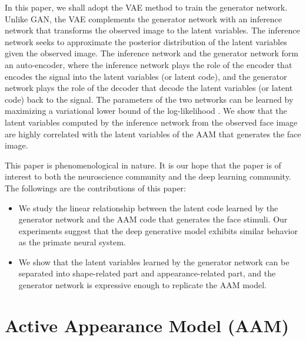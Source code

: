 \documentclass{article}
\begin{document}
In this paper, we shall adopt the VAE method to train the generator network. Unlike GAN, the VAE complements the generator network with an inference network that transforms the observed image to the latent variables. The inference network seeks to approximate the posterior distribution of the latent variables given the observed image. The inference network and the generator network form an auto-encoder, where the inference network plays the role of the encoder that encodes the signal into the latent variables (or latent code), and the generator network plays the role of the decoder that decode the latent variables (or latent code) back to the signal. The parameters of the two networks can be learned by maximizing a variational lower bound of the log-likelihood \cite{blei2017variational}. We show that the latent variables computed by the inference network from the observed face image are highly correlated with the latent variables of the AAM that generates the face image.


 This paper is phenomenological in nature. It is our hope that the paper is of interest to both the neuroscience community and the deep learning community.  The followings are the contributions of this paper:
\begin{itemize}
\item We study the linear relationship between the latent code learned by the generator network and the AAM code that generates the face stimuli. Our experiments suggest that the deep generative model exhibits similar behavior as the primate neural system.
\item We show that the latent variables learned by the generator network can be separated into shape-related part and appearance-related part, and the generator network is expressive enough to replicate the AAM model.
\end{itemize}

\section{Active Appearance Model (AAM)}\label{sec:AAM} %
\end{document}

